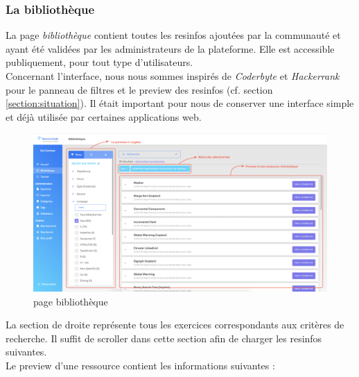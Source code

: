 \subsubsection{La bibliothèque}

La page \textit{bibliothèque} contient toutes les \glspl{resinfo} ajoutées par la communauté et ayant été validées par les administrateurs de la plateforme. Elle est accessible publiquement, pour tout type d'utilisateurs.\\

Concernant l'interface, nous nous sommes inspirés de \textit{Coderbyte} et \textit{Hackerrank} pour le panneau de filtres et le preview des \glspl{resinfo} (cf. section \ref{section:situation}). Il était important pour nous de conserver une interface simple et déjà utilisée par certaines applications web.

\begin{figure}[H]
    \includegraphics[width=\textwidth,height=\textheight,keepaspectratio]{images/client/search-library.png}
    \centering
    \caption[SourceCode : page bibliothèque]{page bibliothèque}
    \label{figure:bibliothequeOverview}
\end{figure}


La section de droite représente tous les exercices correspondants aux critères de recherche. Il suffit de scroller dans cette section afin de charger les \glspl{resinfo} suivantes.\\

Le preview d'une ressource contient les informations suivantes :

